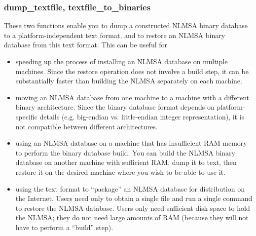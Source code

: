 \documentclass{howto}
\begin{document}
\subsubsection{dump_textfile, textfile_to_binaries}
These two functions enable you to dump a constructed NLMSA binary database
to a platform-independent text format, and to restore an NLMSA binary database
from this text format.  This can be useful for 
\begin{itemize}
\item speeding up the process of installing an NLMSA database on multiple
machines.  Since the restore operation does not involve a build step, it 
can be substantially faster than building the NLMSA separately on each machine.

\item moving an NLMSA database from one machine to a machine with a different
binary architecture.  Since the binary database format depends on platform-specific
details (e.g. big-endian vs. little-endian integer representation), it is not
compatible between different architectures.

\item using an NLMSA database on a machine that has insufficient RAM memory
to perform the binary database build.  You can build the NLMSA binary database
on another machine with sufficient RAM, dump it to text, then restore it on
the desired machine where you wish to be able to use it.

\item using the text format to ``package'' an NLMSA database for distribution
on the Internet.  Users need only to obtain a single file and run a single command
to restore the NLMSA database.  Users only need sufficient disk space to hold
the NLMSA; they do not need large amounts of RAM (because they will not have to
perform a ``build'' step).

\end{itemize}
\end{document}
